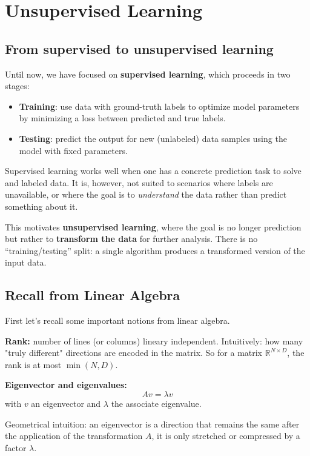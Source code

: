 \chapter{Unsupervised Learning}

\section{From supervised to unsupervised learning}
Until now, we have focused on \textbf{supervised learning}, which proceeds in two stages:
\begin{itemize}
  \item \textbf{Training}: use data with ground-truth labels to optimize model parameters by minimizing a loss between predicted and true labels.
  \item \textbf{Testing}: predict the output for new (unlabeled) data samples using the model with fixed parameters.
\end{itemize}
Supervised learning works well when one has a concrete prediction task to solve and labeled
data. It is, however, not suited to scenarios where labels are unavailable, or where the goal is
to \emph{understand} the data rather than predict something about it.

This motivates \textbf{unsupervised learning}, where the goal is no longer prediction but
rather to \textbf{transform the data} for further analysis. There is no ``training/testing''
split: a single algorithm produces a transformed version of the input data.

\section{Recall from Linear Algebra}
First let's recall some important notions from linear algebra. 

\textbf{Rank:} number of lines (or columns) lineary independent. Intuitively: how many "truly different" directions are encoded in the matrix. 
So for a matrix $\mathbb{R}^{N \times D}$, the rank is at most $\min(N,D)$.

\textbf{Eigenvector and eigenvalues:} \[
  Av = \lambda v
\]with $v$ an eigenvector and $\lambda$ the associate eigenvalue.

Geometrical intuition: an eigenvector is a direction that remains the same after the application of the transformation $A$, it is only stretched or compressed by a factor $\lambda$. 

